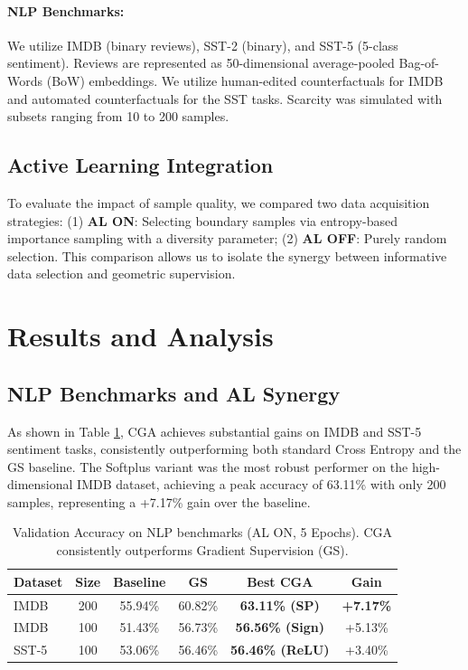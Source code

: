 \documentclass[sigconf,anonymous]{aamas}
\begin{document}
\paragraph{NLP Benchmarks:}
We utilize IMDB (binary reviews), SST-2 (binary), and SST-5 (5-class sentiment). Reviews are represented as 50-dimensional average-pooled Bag-of-Words (BoW) embeddings. We utilize human-edited counterfactuals for IMDB \cite{Kaushik2020Learning} and automated counterfactuals for the SST tasks. Scarcity was simulated with subsets ranging from 10 to 200 samples.

\subsection{Active Learning Integration}
To evaluate the impact of sample quality, we compared two data acquisition strategies: (1) \textbf{AL ON}: Selecting boundary samples via entropy-based importance sampling with a diversity parameter; (2) \textbf{AL OFF}: Purely random selection. This comparison allows us to isolate the synergy between informative data selection and geometric supervision.

\section{Results and Analysis}
\label{sec:results}

\subsection{NLP Benchmarks and AL Synergy}
As shown in Table \ref{tab:nlp_results}, CGA achieves substantial gains on IMDB and SST-5 sentiment tasks, consistently outperforming both standard Cross Entropy and the GS baseline. The Softplus variant was the most robust performer on the high-dimensional IMDB dataset, achieving a peak accuracy of 63.11\% with only 200 samples, representing a +7.17\% gain over the baseline.

\begin{table}[h]
\centering
\caption{Validation Accuracy on NLP benchmarks (AL ON, 5 Epochs). CGA consistently outperforms Gradient Supervision (GS).}
\label{tab:nlp_results}
\begin{tabular}{@{}lccccc@{}}
\toprule
\textbf{Dataset} & \textbf{Size} & \textbf{Baseline} & \textbf{GS \cite{teney2020learning}} & \textbf{Best CGA} & \textbf{Gain} \\ \midrule
IMDB & 200 & 55.94\% & 60.82\% & \textbf{63.11\% (SP)} & \textbf{+7.17\%}
 \\
IMDB & 100 & 51.43\% & 56.73\% & \textbf{56.56\% (Sign)} & +5.13\%
 \\
SST-5 & 100 & 53.06\% & 56.46\% & \textbf{56.46\% (ReLU)} & +3.40\%
 \bottomrule
\end{tabular}
\end{table}
\end{document}

